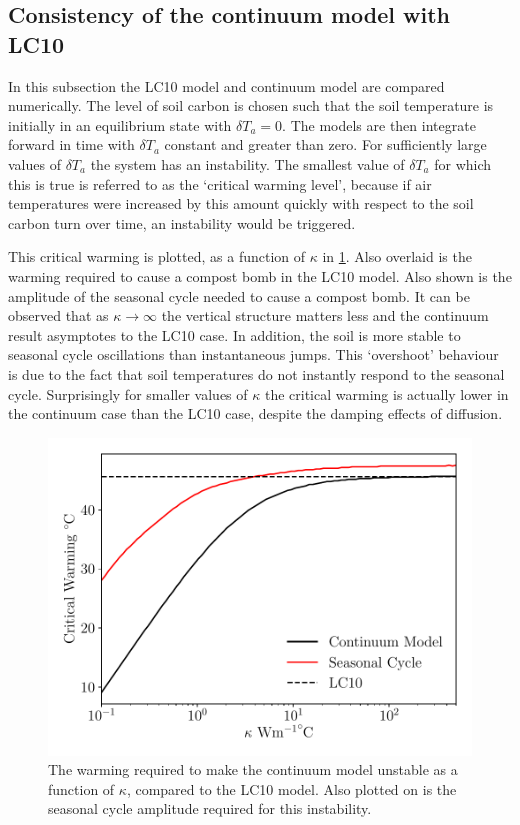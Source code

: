 \subsection{Consistency of the continuum model with LC10}
\label{sec:consistency_with_LC10}
In this subsection the LC10 model and continuum model are compared numerically. The level of soil carbon is chosen such that the soil temperature is
initially in an equilibrium state with $\delta T_{a} = 0$. The models are then integrate forward in time with $\delta T_a$ constant and greater than zero.
For sufficiently large values of $\delta T_a$ the system has an instability. The smallest value of $\delta T_a$ for which this is true is referred to
as the `critical warming level', because if air temperatures were increased by this amount quickly with respect to the soil carbon turn over time,
an instability would be triggered.

This critical warming is plotted, as a function of $\kappa$ in \cref{fig:comparison_with_lc10}.
Also overlaid is the warming required to cause a compost bomb in the LC10
model. Also shown is the amplitude of the seasonal cycle needed to cause a compost bomb.
It can be observed that as $\kappa\rightarrow\infty$ the vertical structure matters less and the continuum result asymptotes to the LC10 case. In addition, the soil is more stable
to seasonal cycle oscillations than instantaneous jumps. This `overshoot' behaviour \parencite{Ritchie2019,Ritchie2021} is due to the fact that soil temperatures do not instantly respond to the seasonal cycle.
Surprisingly for smaller values of $\kappa$ the critical warming is actually lower in the continuum case than the LC10 case,
despite the damping effects of diffusion.
\begin{figure}
  \centering
  \includegraphics[keepaspectratio,width=\textwidth]{dimensional_continuum_vs_lc10}
  \caption[Critical warming level in the continuum compost bomb]{The warming required to make the continuum model unstable as a function of $\kappa$, compared to the LC10 model.
    Also plotted on is the seasonal cycle amplitude required for this instability.}
  \label{fig:comparison_with_lc10}
\end{figure}

